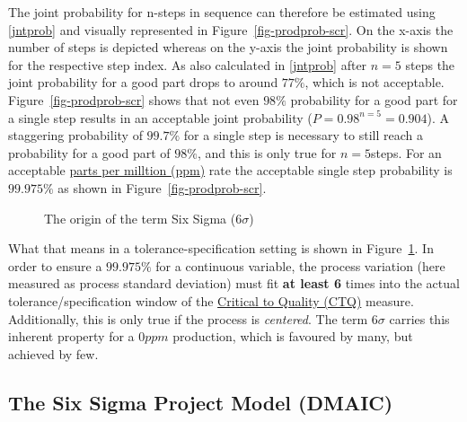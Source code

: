 \documentclass[
  a4paper,
]{scrbook}
\begin{document}
The joint probability for n-steps in sequence can therefore be estimated
using \eqref{jntprob} and visually represented in
Figure~\ref{fig-prodprob-scr}. On the x-axis the number of steps is
depicted whereas on the y-axis the joint probability is shown for the
respective step index. As also calculated in \eqref{jntprob} after
\(n=5\) steps the joint probability for a good part drops to around
\(77\%\), which is not acceptable. Figure~\ref{fig-prodprob-scr} shows
that not even \(98\%\) probability for a good part for a single step
results in an acceptable joint probability (\(P = 0.98^{n=5} = 0.904\)).
A staggering probability of \(99.7\%\) for a single step is necessary to
still reach a probability for a good part of \(98\%\), and this is only
true for \(n = 5\)steps. For an acceptable \hyperref[ppm]{parts per
milltion (ppm)} rate the acceptable single step probability is
\(99.975\%\) as shown in Figure~\ref{fig-prodprob-scr}.

\begin{figure}[H]


\caption{\label{fig-sixsigma-scr}The origin of the term Six Sigma
(\(6\sigma\))}

\end{figure}%

What that means in a tolerance-specification setting is shown in
Figure~\ref{fig-sixsigma-scr}. In order to ensure a \(99.975\%\) for a
continuous variable, the process variation (here measured as process
standard deviation) must fit \textbf{at least 6} times into the actual
tolerance/specification window of the \hyperref[CTQ]{Critical to Quality
(CTQ)} measure. Additionally, this is only true if the process is
\emph{centered}. The term \(6\sigma\) carries this inherent property for
a \(0ppm\) production, which is favoured by many, but achieved by few.

\subsection{The Six Sigma Project Model
(DMAIC)}\label{the-six-sigma-project-model-dmaic}
\end{document}
